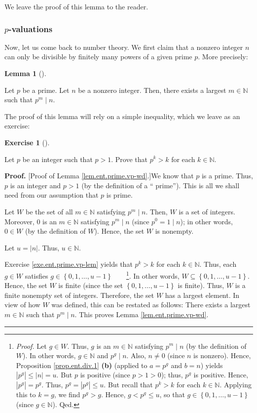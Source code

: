 \documentclass[numbers=enddot,12pt,final,onecolumn,notitlepage]{scrartcl}%
\newcounter{exer}
\numberwithin{exer}{subsection}
\theoremstyle{definition}
\newtheorem{lem}[theo]{Lemma}
\newenvironment{lemma}[1][]
{\begin{lem}[#1]\begin{leftbar}}
{\end{leftbar}\end{lem}}
\newtheorem{exmp}[exer]{Exercise}
\newenvironment{exercise}[1][]
{\begin{exmp}[#1]\begin{leftbar}}
{\end{leftbar}\end{exmp}}
\newenvironment{proof}[1][Proof]{\noindent\textbf{#1.} }{\ \rule{0.5em}{0.5em}}
\begin{document}
We leave the proof of this lemma to the reader.

\subsubsection{$p$-valuations}

Now, let us come back to number theory. We first claim that a nonzero integer
$n$ can only be divisible by finitely many powers of a given prime $p$. More precisely:

\begin{lemma}
\label{lem.ent.prime.vp-wd}Let $p$ be a prime. Let $n$ be a nonzero integer.
Then, there exists a largest $m\in\mathbb{N}$ such that $p^{m}\mid n$.
\end{lemma}

The proof of this lemma will rely on a simple inequality, which we leave as an exercise:

\begin{exercise}
\label{exe.ent.prime.vp-lem}Let $p$ be an integer such that $p>1$. Prove that
$p^{k}>k$ for each $k\in\mathbb{N}$.
\end{exercise}

\begin{proof}
[Proof of Lemma \ref{lem.ent.prime.vp-wd}.]We know that $p$ is a prime. Thus,
$p$ is an integer and $p>1$ (by the definition of a \textquotedblleft
prime\textquotedblright). This is all we shall need from our assumption that
$p$ is prime.

Let $W$ be the set of all $m\in\mathbb{N}$ satisfying $p^{m}\mid n$. Then, $W$
is a set of integers. Moreover, $0$ is an $m\in\mathbb{N}$ satisfying
$p^{m}\mid n$ (since $p^{0}=1\mid n$); in other words, $0\in W$ (by the
definition of $W$). Hence, the set $W$ is nonempty.

Let $u=\left\vert n\right\vert $. Thus, $u\in\mathbb{N}$.

Exercise \ref{exe.ent.prime.vp-lem} yields that $p^{k}>k$ for each
$k\in\mathbb{N}$. Thus, each $g\in W$ satisfies $g\in\left\{  0,1,\ldots
,u-1\right\}  $\ \ \ \ \footnote{\textit{Proof.} Let $g\in W$. Thus, $g$ is an
$m\in\mathbb{N}$ satisfying $p^{m}\mid n$ (by the definition of $W$). In other
words, $g\in\mathbb{N}$ and $p^{g}\mid n$. Also, $n\neq0$ (since $n$ is
nonzero). Hence, Proposition \ref{prop.ent.div.1} \textbf{(b)} (applied to
$a=p^{g}$ and $b=n$) yields $\left\vert p^{g}\right\vert \leq\left\vert
n\right\vert =u$. But $p$ is positive (since $p>1>0$); thus, $p^{g}$ is
positive. Hence, $\left\vert p^{g}\right\vert =p^{g}$. Thus, $p^{g}=\left\vert
p^{g}\right\vert \leq u$. But recall that $p^{k}>k$ for each $k\in\mathbb{N}$.
Applying this to $k=g$, we find $p^{g}>g$. Hence, $g<p^{g}\leq u$, so that
$g\in\left\{  0,1,\ldots,u-1\right\}  $ (since $g\in\mathbb{N}$). Qed.}. In
other words, $W\subseteq\left\{  0,1,\ldots,u-1\right\}  $. Hence, the set $W$
is finite (since the set $\left\{  0,1,\ldots,u-1\right\}  $ is finite). Thus,
$W$ is a finite nonempty set of integers. Therefore, the set $W$ has a largest
element. In view of how $W$ was defined, this can be restated as follows:
There exists a largest $m\in\mathbb{N}$ such that $p^{m}\mid n$. This proves
Lemma \ref{lem.ent.prime.vp-wd}.
\end{proof}
\end{document}
